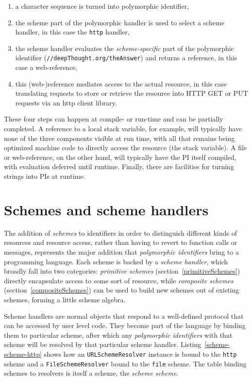 \documentclass[preprint,authoryear]{acm_proc_article-sp}
\begin{document}
\begin{enumerate}
\item a character sequence is turned into  polymorphic identifier,
\item the scheme part of the polymorphic handler is used to select a scheme handler, in this case the {\tt http} handler,
\item the scheme handler evaluates the {\em scheme-specific} part of the polymorphic identifier ({\tt //deepThought.org/theAnswer})
	 and returns a reference, in this case a web-reference,
\item this (web-)reference mediates access to the actual resource, in this case translating requests to store or retrieve the 
	resource into HTTP GET or PUT requests via an http client library.
\end{enumerate}

These four steps can happen at compile- or run-time and can be partially completed.
A reference to a local stack variable, for example, will typically have none of the
three components visible at run time, with all that remains being optimized 
machine code to directly access the resource (the stack variable).
A file or web-reference, on the other hand, will typically have the PI itself
compiled, with evaluation deferred until runtime.  Finally, there are facilities
for turning strings into PIs at runtime.


\section{Schemes and scheme handlers}
\label{schemes}
The addition of {\em schemes} to identifiers in order to distinguish different kinds of resources
and resource access, rather than having to revert to function calls or messages, represents
the major addition that {\em polymorphic identifiers} bring to a programming language.
Each scheme is backed by a {\em scheme handler}, which broadly fall into two categories:
 {\em primitive schemes} (section~\ref{primitiveSchemes})
directly encapsulate access to some sort of resource, while {\em composite schemes} (section~\ref{compositeSchemes})
can be used to build new schemes out of existing schemes, forming a little scheme algebra.


Scheme handlers are normal objects that respond to a well-defined protocol that can be
accessed by user level code.  They
become part of the language by binding them to particular scheme, after which
any {\em polymorphic identifiers} with that scheme will be resolved by that particular scheme handler.
Listing~\ref{scheme-scheme-http} shows how an {\tt URLSchemeResolver} instance is bound
to the {\tt http} scheme and a {\tt FileSchemeResolver} bound to the {\tt file} scheme.  The table 
binding schemes to resolvers is itself a scheme, the {\em scheme scheme}.
\end{document}
